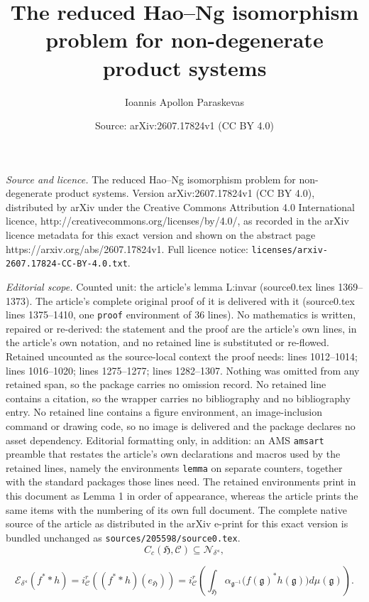 \documentclass[10pt,a4paper]{amsart}
\title{The reduced Hao--Ng isomorphism problem for non-degenerate product systems}
\author{Ioannis Apollon Paraskevas}
\date{Source: arXiv:2607.17824v1 (CC BY 4.0)}
\newcommand{\C}{{\mathcal{C}}}
\newcommand{\E}{{\mathcal{E}}}
\newcommand{\N}{{\mathcal{N}}}
\def\al{\alpha}
\def\de{\delta}
\newcommand{\fH}{{\mathfrak{H}}}
\newcommand{\fg}{{\mathfrak{g}}}
\begin{document}
\maketitle

\noindent\emph{Source and licence.} The reduced Hao--Ng isomorphism problem for non-degenerate product systems. Version arXiv:2607.17824v1 (CC BY 4.0), distributed by arXiv under the Creative Commons Attribution 4.0 International licence, http://creativecommons.org/licenses/by/4.0/, as recorded in the arXiv licence metadata for this exact version and shown on the abstract page https://arxiv.org/abs/2607.17824v1. Full licence notice: \texttt{licenses/arxiv-2607.17824-CC-BY-4.0.txt}.\par\smallskip

\noindent\textit{Editorial scope.} Counted unit: the article's lemma L:invar (source0.tex lines 1369--1373). The article's complete original proof of it is delivered with it (source0.tex lines 1375--1410, one \texttt{proof} environment of 36 lines). No mathematics is written, repaired or re-derived: the statement and the proof are the article's own lines, in the article's own notation, and no retained line is substituted or re-flowed.  Retained uncounted as the source-local context the proof needs: lines 1012--1014; lines 1016--1020; lines 1275--1277; lines 1282--1307.  Nothing was omitted from any retained span, so the package carries no omission record.  No retained line contains a citation, so the wrapper carries no bibliography and no bibliography entry.  No retained line contains a figure environment, an image-inclusion command or drawing code, so no image is delivered and the package declares no asset dependency.  Editorial formatting only, in addition: an AMS \texttt{amsart} preamble that restates the article's own declarations and macros used by the retained lines, namely the environments \texttt{lemma} on separate counters, together with the standard packages those lines need.  The retained environments print in this document as Lemma 1 in order of appearance, whereas the article prints the same items with the numbering of its own full document.  The complete native source of the article as distributed in the arXiv e-print for this exact version is bundled unchanged as \texttt{sources/205598/source0.tex}.
\begin{equation}\label{Eq:Buss}
C_c(\fH,\C)\subseteq\N_{\de^{\rtimes}},
\end{equation}

\begin{equation}\label{Eq:avercomp}
\E_{\de^{\rtimes}}(f^* \ast h)= i_\C^r\left((f^*\ast h)(e_{\fH})\right)= i_\C^r\left(
\int_{\fH}
\al_{\fg^{-1}}\big(f(\fg)^*h(\fg)\big) d\mu(\fg)\right).
\end{equation}
\end{document}
